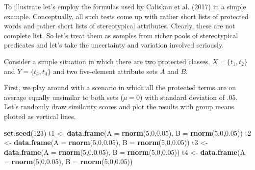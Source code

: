 \documentclass[10pt,dvipsnames,enabledeprecatedfontcommands]{scrartcl}
\newenvironment{Shaded}{\begin{snugshade}}{\end{snugshade}}
\newcommand{\KeywordTok}[1]{\textcolor[rgb]{0.13,0.29,0.53}{\textbf{#1}}}
\newcommand{\DataTypeTok}[1]{\textcolor[rgb]{0.13,0.29,0.53}{#1}}
\newcommand{\DecValTok}[1]{\textcolor[rgb]{0.00,0.00,0.81}{#1}}
\newcommand{\FloatTok}[1]{\textcolor[rgb]{0.00,0.00,0.81}{#1}}
\newcommand{\StringTok}[1]{\textcolor[rgb]{0.31,0.60,0.02}{#1}}
\newcommand{\NormalTok}[1]{#1}
\begin{document}
To illustrate let's employ the formulas used by Caliskan et al. (2017)
in a simple example. Conceptually, all such tests come up with rather
short lists of protected words and rather short lists of stereotypical
attributes. Clearly, these are not complete list. So let's treat them as
samples from richer pools of stereotypical predicates and let's take the
uncertainty and variation involved seriously.

Consider a simple situation in which there are two protected classes,
\(X=\{t_1,t_2\}\) and \(Y=\{t_3,t_4\}\) and two five-element attribute
sets \(A\) and \(B\).

First, we play around with a scenario in which all the protected terms
are on average equally unsimilar to both sets (\(\mu =0\)) with standard
deviation of \(.05\). Let's randomly draw similarity scores and plot the
results with group means plotted as vertical lines.

\footnotesize

\begin{Shaded}
\begin{Highlighting}[]
\KeywordTok{set.seed}\NormalTok{(}\DecValTok{123}\NormalTok{)}
\NormalTok{t1 <-}\StringTok{ }\KeywordTok{data.frame}\NormalTok{(}\DataTypeTok{A  =} \KeywordTok{rnorm}\NormalTok{(}\DecValTok{5}\NormalTok{,}\DecValTok{0}\NormalTok{,}\FloatTok{0.05}\NormalTok{), }\DataTypeTok{B =} \KeywordTok{rnorm}\NormalTok{(}\DecValTok{5}\NormalTok{,}\DecValTok{0}\NormalTok{,}\FloatTok{0.05}\NormalTok{))}
\NormalTok{t2 <-}\StringTok{ }\KeywordTok{data.frame}\NormalTok{(}\DataTypeTok{A  =} \KeywordTok{rnorm}\NormalTok{(}\DecValTok{5}\NormalTok{,}\DecValTok{0}\NormalTok{,}\FloatTok{0.05}\NormalTok{), }\DataTypeTok{B =} \KeywordTok{rnorm}\NormalTok{(}\DecValTok{5}\NormalTok{,}\DecValTok{0}\NormalTok{,}\FloatTok{0.05}\NormalTok{))}
\NormalTok{t3 <-}\StringTok{ }\KeywordTok{data.frame}\NormalTok{(}\DataTypeTok{A  =} \KeywordTok{rnorm}\NormalTok{(}\DecValTok{5}\NormalTok{,}\DecValTok{0}\NormalTok{,}\FloatTok{0.05}\NormalTok{), }\DataTypeTok{B =} \KeywordTok{rnorm}\NormalTok{(}\DecValTok{5}\NormalTok{,}\DecValTok{0}\NormalTok{,}\FloatTok{0.05}\NormalTok{))}
\NormalTok{t4 <-}\StringTok{ }\KeywordTok{data.frame}\NormalTok{(}\DataTypeTok{A  =} \KeywordTok{rnorm}\NormalTok{(}\DecValTok{5}\NormalTok{,}\DecValTok{0}\NormalTok{,}\FloatTok{0.05}\NormalTok{), }\DataTypeTok{B =} \KeywordTok{rnorm}\NormalTok{(}\DecValTok{5}\NormalTok{,}\DecValTok{0}\NormalTok{,}\FloatTok{0.05}\NormalTok{))}
\end{Highlighting}
\end{Shaded}
\end{document}
